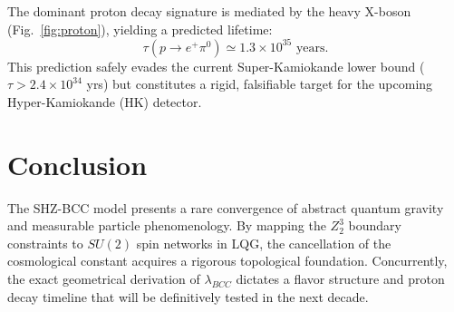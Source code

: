 \documentclass[11pt,a4paper,twocolumn]{article}
\begin{document}
The dominant proton decay signature is mediated by the heavy X-boson (Fig.~\ref{fig:proton}), yielding a predicted lifetime:
\begin{equation}
    \tau(p \to e^+ \pi^0) \simeq 1.3 \times 10^{35} \text{ years}.
\end{equation}
This prediction safely evades the current Super-Kamiokande lower bound ($\tau > 2.4 \times 10^{34}$ yrs) but constitutes a rigid, falsifiable target for the upcoming Hyper-Kamiokande (HK) detector.

\section{Conclusion}
The SHZ-BCC model presents a rare convergence of abstract quantum gravity and measurable particle phenomenology. By mapping the $Z_2^3$ boundary constraints to $SU(2)$ spin networks in LQG, the cancellation of the cosmological constant acquires a rigorous topological foundation. Concurrently, the exact geometrical derivation of $\lambda_{BCC}$ dictates a flavor structure and proton decay timeline that will be definitively tested in the next decade.
\end{document}
